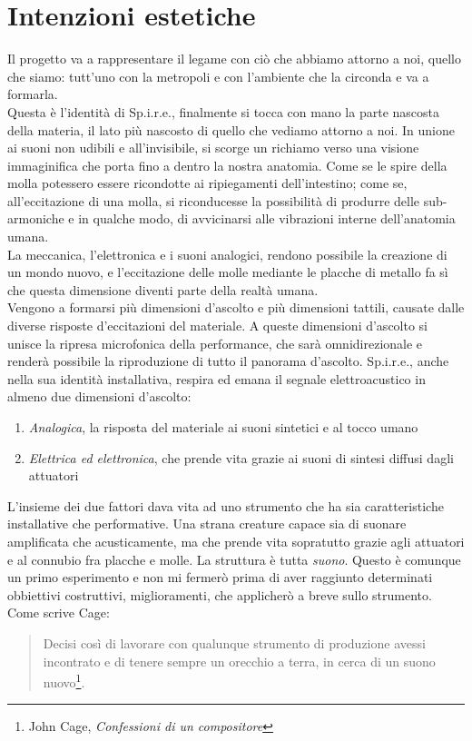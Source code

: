 \section{Intenzioni estetiche}
Il progetto va a rappresentare il legame con ciò che abbiamo attorno a noi, quello che siamo: tutt'uno con la metropoli e con l'ambiente che la circonda e va a formarla. \\
Questa è l'identità di Sp.i.r.e., finalmente si tocca con mano la parte nascosta della materia, il lato più nascosto di quello che vediamo attorno a noi. In unione ai suoni non udibili e all'invisibile, si scorge un richiamo verso una visione immaginifica che porta fino a dentro la nostra anatomia. Come se le spire della molla potessero essere ricondotte ai ripiegamenti dell'intestino; come se, all'eccitazione di una molla, si riconducesse la possibilità di produrre delle sub-armoniche e in qualche modo, di avvicinarsi alle vibrazioni interne dell'anatomia umana.\\
La meccanica, l'elettronica e i suoni analogici, rendono possibile la creazione di un mondo nuovo, e l'eccitazione delle molle mediante le placche di metallo fa sì che questa dimensione diventi parte della realtà umana. \\
Vengono a formarsi più dimensioni d'ascolto e più dimensioni tattili, causate dalle diverse risposte d'eccitazioni del materiale. A queste dimensioni d'ascolto si unisce la ripresa microfonica della performance, che sarà omnidirezionale e renderà possibile la riproduzione di tutto il panorama d'ascolto. Sp.i.r.e., anche nella sua identità installativa, respira ed emana il segnale elettroacustico in almeno due dimensioni d'ascolto:
\begin{enumerate}
\item{\textit{Analogica}, la risposta del materiale ai suoni sintetici e al tocco umano}
\item{\textit{Elettrica ed elettronica}, che prende vita grazie ai suoni di sintesi diffusi dagli attuatori}
\end{enumerate}

L'insieme dei due fattori dava vita ad uno strumento che ha sia caratteristiche installative che performative. Una strana creature capace sia di suonare amplificata che acusticamente, ma che prende vita sopratutto grazie agli attuatori e al connubio fra placche e molle. La struttura è tutta \textit{suono}. Questo è comunque un primo esperimento e non mi fermerò prima di aver raggiunto determinati obbiettivi costruttivi, miglioramenti, che applicherò a breve sullo strumento. Come scrive Cage:
\begin{small}
\begin{quotation}
Decisi così di lavorare con qualunque strumento di produzione avessi incontrato e di tenere sempre un orecchio a terra, in cerca di un suono nuovo\footnote{John Cage, \textit{Confessioni di un compositore}}.
\end{quotation}
\end{small}
